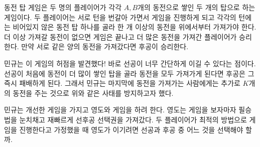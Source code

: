 동전 탑 게임은 두 명의 플레이어가 각각 $A, B$개의 동전으로 쌓인 두 개의 탑으로 하는 게임이다. 두 플레이어는 서로 턴을 번갈아 가면서 게임을 진행하게 되고 각각의 턴에는 비어있지 않은 동전 탑 하나를 골라 한 개 이상의 동전을 위에서부터 가져가야 한다. 더 이상 가져갈 동전이 없으면 게임은 끝나고 더 많은 동전을 가져간 플레이어가 승리한다. 만약 서로 같은 양의 동전을 가져갔다면 후공이 승리한다.

민규는 이 게임의 허점을 발견했다! 바로 선공이 너무 간단하게 이길 수 있다는 점이다. 선공이 처음에 동전이 더 많이 쌓인 탑을 골라 동전을 모두 가져가게 된다면 후공은 그 즉시 패배하게 된다. 그래서 민규는 마지막에 동전을 가져가는 사람에게는 추가로 $K$개의 동전을 주는 것으로 위와 같은 사태를 방지하고자 했다.

민규는 개선한 게임을 가지고 영도와 게임을 하려 한다. 영도는 게임을 보자마자 필승법을 눈치채고 재빠르게 선후공 선택권을 가져갔다. 두 플레이어가 최적의 방법으로 게임을 진행한다고 가정했을 때 영도가 이기려면 선공과 후공 중 어느 것을 선택해야 할까.
